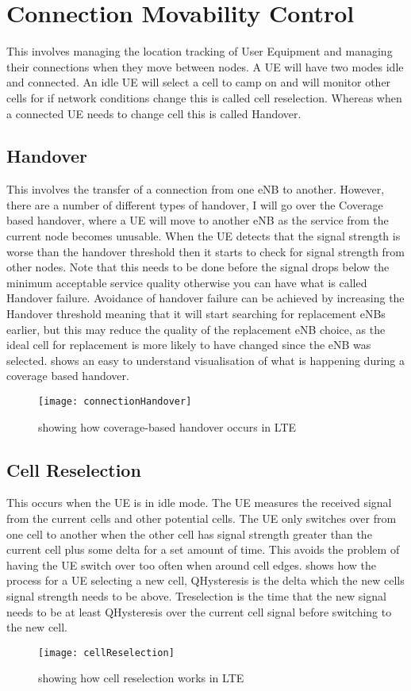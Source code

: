 \section{Connection Movability Control}
{
	This involves managing the location tracking of User Equipment and managing their connections when they move between nodes. A UE will have two modes idle and connected. An idle UE will select a cell to camp on and will monitor other cells for if network conditions change this is called cell reselection. Whereas when a connected UE needs to change cell this is called Handover\cite{karandikar2017mobility}.
	\subsection{Handover}
	{
		This involves the transfer of a connection from one eNB to another. However, there are a number of different types of handover, I will go over the Coverage based handover, where a UE will move to another eNB as the service from the current node becomes unusable. When the UE detects that the signal strength is worse than the handover threshold then it starts to check for signal strength from other nodes. Note that this needs to be done before the signal drops below the minimum acceptable service quality otherwise you can have what is called Handover failure. Avoidance of handover failure can be achieved by increasing the Handover threshold meaning that it will start searching for replacement eNBs earlier, but this may reduce the quality of the replacement eNB choice, as the ideal cell for replacement is more likely to have changed since the eNB was selected.  shows an easy to understand visualisation of what is happening during a coverage based handover.  
		\begin{figure}
			\centering
			\texttt{[image: connectionHandover]}
			\caption{showing how coverage-based handover occurs in LTE\cite{karandikar2017mobility}}
			\label{fig:connectionHandover}
		\end{figure}
	}
	\subsection{Cell Reselection}
	{
		This occurs when the UE is in idle mode. The UE measures the received signal from the current cells and other potential cells. The UE only switches over from one cell to another when the other cell has signal strength greater than the current cell plus some delta for a set amount of time. This avoids the problem of having the UE switch over too often when around cell edges.  shows how the process for a UE selecting a new cell, QHysteresis is the delta which the new cells signal strength needs to be above. Treselection is the time that the new signal needs to be at least QHysteresis over the current cell signal before switching to the new cell.
		\begin{figure}
			\centering
			\texttt{[image: cellReselection]}
			\caption{showing how cell reselection works in LTE\cite{karandikar2017mobility}}
			\label{fig:cellReselection}
		\end{figure}
	}
}